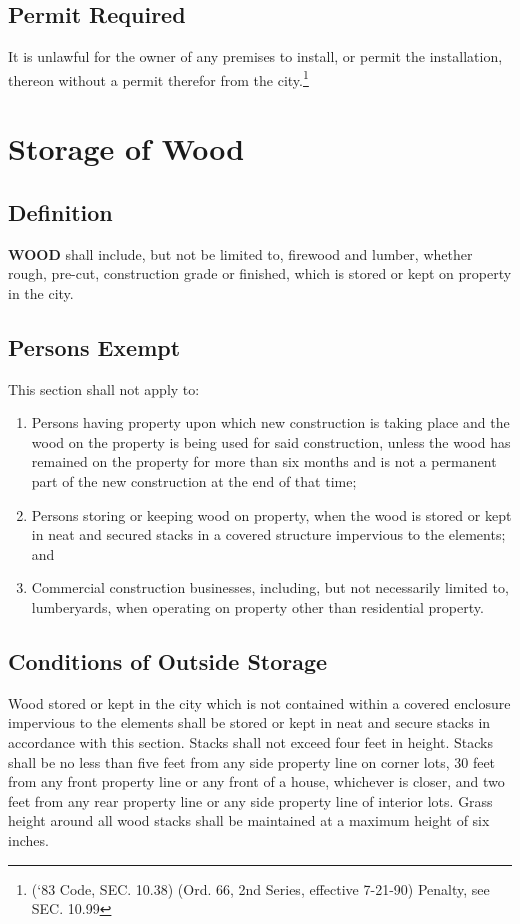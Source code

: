 \subsection{Permit Required}
It is unlawful for the owner of any premises to install, or permit the installation, thereon without a permit therefor from the city.\footnote{(‘83 Code, SEC. 10.38)  (Ord. 66, 2nd Series, effective 7-21-90)  Penalty, see SEC. 10.99}

\section{Storage of Wood}
\subsection{Definition}
\textbf{WOOD} shall include, but not be limited to, firewood and lumber, whether rough, pre-cut, construction grade or finished, which is stored or kept on property in the city.
\subsection{Persons Exempt}
This section shall not apply to:
\begin{enumerate}[{\indent}1)]
    \item Persons having property upon which new construction is taking place and the wood on the property is being used for said construction, unless the wood has remained on the property for more than six months and is not a permanent part of the new construction at the end of that time;
    \item Persons storing or keeping wood on property, when the wood is stored or kept in neat and secured stacks in a covered structure impervious to the elements; and
    \item Commercial construction businesses, including, but not necessarily limited to, lumberyards, when operating on property other than residential property.
\end{enumerate}
\subsection{Conditions of Outside Storage}
Wood stored or kept in the city which is not contained within a covered enclosure impervious to the elements shall be stored or kept in neat and secure stacks in accordance with this section.  Stacks shall not exceed four feet in height.  Stacks shall be no less than five feet from any side property line on corner lots, 30 feet from any front property line or any front of a house, whichever is closer, and two feet from any rear property line or any side property line of interior lots.  Grass height around all wood stacks shall be maintained at a maximum height of six inches.
